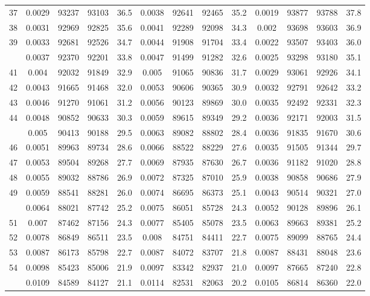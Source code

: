 \documentclass[
  14pt,
]{article}
\begin{document}
\begin{longtable}[t]{lcccccccccccc}
37 & 0.0029 & 93237 & 93103 & 36.5 & 0.0038 & 92641 & 92465 & 35.2 & 0.0019 & 93877 & 93788 & 37.8\\
38 & 0.0031 & 92969 & 92825 & 35.6 & 0.0041 & 92289 & 92098 & 34.3 & 0.002 & 93698 & 93603 & 36.9\\
39 & 0.0033 & 92681 & 92526 & 34.7 & 0.0044 & 91908 & 91704 & 33.4 & 0.0022 & 93507 & 93403 & 36.0\\
\addlinespace
40 & 0.0037 & 92370 & 92201 & 33.8 & 0.0047 & 91499 & 91282 & 32.6 & 0.0025 & 93298 & 93180 & 35.1\\
41 & 0.004 & 92032 & 91849 & 32.9 & 0.005 & 91065 & 90836 & 31.7 & 0.0029 & 93061 & 92926 & 34.1\\
42 & 0.0043 & 91665 & 91468 & 32.0 & 0.0053 & 90606 & 90365 & 30.9 & 0.0032 & 92791 & 92642 & 33.2\\
43 & 0.0046 & 91270 & 91061 & 31.2 & 0.0056 & 90123 & 89869 & 30.0 & 0.0035 & 92492 & 92331 & 32.3\\
44 & 0.0048 & 90852 & 90633 & 30.3 & 0.0059 & 89615 & 89349 & 29.2 & 0.0036 & 92171 & 92003 & 31.5\\
\addlinespace
45 & 0.005 & 90413 & 90188 & 29.5 & 0.0063 & 89082 & 88802 & 28.4 & 0.0036 & 91835 & 91670 & 30.6\\
46 & 0.0051 & 89963 & 89734 & 28.6 & 0.0066 & 88522 & 88229 & 27.6 & 0.0035 & 91505 & 91344 & 29.7\\
47 & 0.0053 & 89504 & 89268 & 27.7 & 0.0069 & 87935 & 87630 & 26.7 & 0.0036 & 91182 & 91020 & 28.8\\
48 & 0.0055 & 89032 & 88786 & 26.9 & 0.0072 & 87325 & 87010 & 25.9 & 0.0038 & 90858 & 90686 & 27.9\\
49 & 0.0059 & 88541 & 88281 & 26.0 & 0.0074 & 86695 & 86373 & 25.1 & 0.0043 & 90514 & 90321 & 27.0\\
\addlinespace
50 & 0.0064 & 88021 & 87742 & 25.2 & 0.0075 & 86051 & 85728 & 24.3 & 0.0052 & 90128 & 89896 & 26.1\\
51 & 0.007 & 87462 & 87156 & 24.3 & 0.0077 & 85405 & 85078 & 23.5 & 0.0063 & 89663 & 89381 & 25.2\\
52 & 0.0078 & 86849 & 86511 & 23.5 & 0.008 & 84751 & 84411 & 22.7 & 0.0075 & 89099 & 88765 & 24.4\\
53 & 0.0087 & 86173 & 85798 & 22.7 & 0.0087 & 84072 & 83707 & 21.8 & 0.0087 & 88431 & 88048 & 23.6\\
54 & 0.0098 & 85423 & 85006 & 21.9 & 0.0097 & 83342 & 82937 & 21.0 & 0.0097 & 87665 & 87240 & 22.8\\
\addlinespace
55 & 0.0109 & 84589 & 84127 & 21.1 & 0.0114 & 82531 & 82063 & 20.2 & 0.0105 & 86814 & 86360 & 22.0\\

\end{longtable}
\end{document}
